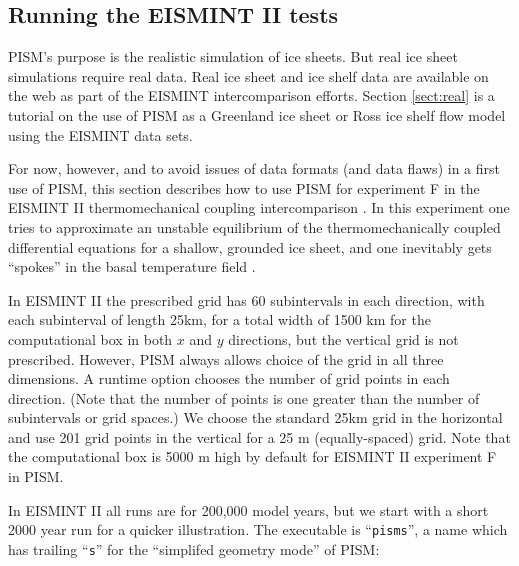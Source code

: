 \documentclass[11pt,final]{amsart}
\renewcommand{\t}[1]{\texttt{#1}}
\begin{document}
\subsection{Running the EISMINT II tests}  PISM's purpose is the realistic simulation of ice sheets.  But real ice sheet simulations require real data.  Real ice sheet and ice shelf data are available on the web as part of the EISMINT intercomparison efforts.  Section \ref{sect:real} is a tutorial on the use of PISM as a Greenland ice sheet or Ross ice shelf flow model using the EISMINT data sets.

For now, however, and to avoid issues of data formats (and data flaws) in a first use of PISM, this section describes how to use PISM for experiment F in the EISMINT II thermomechanical coupling intercomparison \cite{EISMINT00}.  In this experiment one tries to approximate an unstable equilibrium of the thermomechanically coupled differential equations for a shallow, grounded ice sheet, and one inevitably gets ``spokes'' in the basal temperature field \cite{BBL,PayneBaldwin}.  

In EISMINT II the prescribed grid has 60 subintervals in each direction, with each subinterval of length 25km, for a total width of 1500 km for the computational box in both $x$ and $y$ directions, but the vertical grid is not prescribed.  However, PISM always allows choice of the grid in all three dimensions.  A runtime option chooses the number of grid points in each direction.  (Note that the number of points is one greater than the number of subintervals or grid spaces.)  We choose the standard 25km grid in the horizontal and use 201 grid points in the vertical for a 25 m (equally-spaced) grid.  Note that the computational box is 5000 m high by default for EISMINT II experiment F in PISM.  

In EISMINT II all runs are for 200,000 model years, but we start with a short 2000 year run for a quicker illustration.  The executable is ``\t{pisms}'', a name which has trailing ``\t{s}'' for the ``simplifed geometry mode'' of PISM:
\end{document}
